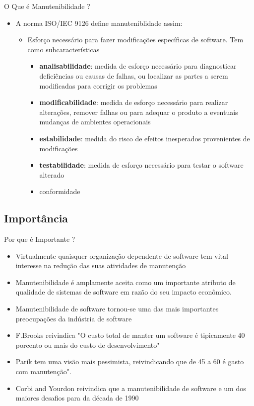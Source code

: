 \begin{frame}{O Que é Manutenibilidade ?}
\begin{itemize}
      \item A norma ISO/IEC 9126 define \alert{manuteniblidade} assim:
      \begin{itemize}
        \item Esforço necessário para fazer modificações específicas de software. Tem como subcaracterísticas 
        \begin{itemize}
          \item \textbf{analisabilidade}: medida de esforço necessário para diagnosticar deficiências ou causas de 
            falhas, ou localizar as partes a serem modificadas para corrigir os problemas
          \item \textbf{modificabilidade}: medida de esforço necessário para realizar alterações, remover falhas ou 
            para adequar o produto a eventuais mudanças de ambientes operacionais
          \item \textbf{estabilidade}: medida do risco de efeitos inesperados provenientes de modificações
          \item \textbf{testabilidade}: medida de esforço necessário para testar o software alterado
          \item conformidade
        \end{itemize}
      \end{itemize}
      
    \end{itemize}
\end{frame}

\subsection{Importância}
\begin{frame}{Por que é Importante ?}
   \begin{itemize}
    \item Virtualmente quaisquer organização dependente de software tem vital interesse na redução das suas 
      atividades de manutenção
    
    \item Manutenibilidade é amplamente aceita como um importante atributo de qualidade de sistemas de software
      em razão do seu impacto econômico.
      
    \item Manutenibilidade de software tornou-se uma das mais importantes preocupações da indústria de software
    \item F.Brooks reivindica "O custo total de manter um software é tipicamente 40 porcento ou mais do custo de desenvolvimento"

    \item Parik tem uma visão mais pessimista, reivindicando que de 45 a 60 é gasto com manutenção".
    \item Corbi and Yourdon reivindica que a manutenibilidade de software e um dos maiores desafios para da década de 1990
    
   \end{itemize}
\end{frame}

